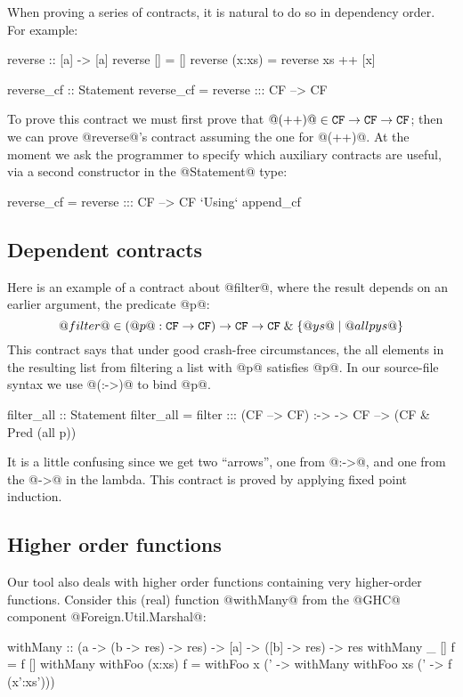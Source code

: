 When proving a series of contracts, it is natural to do so in dependency order.
For example:
\begin{code}
  reverse :: [a] -> [a]
  reverse [] = []
  reverse (x:xs) = reverse xs ++ [x]

  reverse_cf :: Statement
  reverse_cf = reverse ::: CF --> CF
\end{code}
To prove this contract we must first prove that
$@(++)@ \in {\tt CF} \rightarrow {\tt CF} \rightarrow {\tt CF}$;
then we can prove @reverse@'s contract assuming the one for @(++)@.
At the moment we ask the programmer to specify which auxiliary contracts
are useful, via a second constructor in the @Statement@ type:
\begin{code}
  reverse_cf = reverse ::: CF --> CF
                 `Using` append_cf
\end{code}


\subsection{Dependent contracts}

Here is an example of a contract about @filter@,
where the result depends on an earlier argument, the predicate @p@:
$$
@filter@ \in (@p@ : {\tt CF} \rightarrow {\tt CF}) \rightarrow
             {\tt CF} \rightarrow {\tt CF} \;\&\; \{@ys@ \mid @all p ys@ \}
$$
This contract says that under good crash-free circumstances, the
all elements in the resulting list from filtering a list with @p@
satisfies @p@.
In our source-file syntax we use @(:->)@ to bind @p@.
\begin{code}
filter_all :: Statement
filter_all = filter ::: (CF --> CF) :-> \p ->
                        CF --> (CF & Pred (all p))
\end{code}
It is a little confusing since we get two ``arrows'', one from @:->@,
and one from the @->@ in the lambda.  This contract is proved by
applying fixed point induction.

\subsection{Higher order functions}

Our tool also deals with higher order functions containing
very higher-order functions. Consider this (real) function @withMany@ from the
@GHC@ component @Foreign.Util.Marshal@:

\begin{code}
withMany :: (a -> (b -> res) -> res)
         -> [a] -> ([b] -> res) -> res
withMany _       []     f = f []
withMany withFoo (x:xs) f = withFoo x (\x' ->
      withMany withFoo xs (\xs' -> f (x':xs')))
\end{code}


